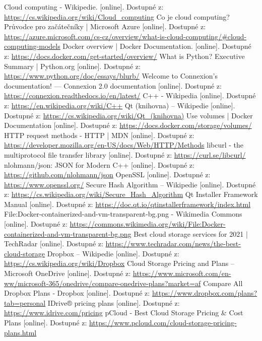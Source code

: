 \documentclass[
  glossaries,
]{kidiplom}
\begin{document}
\begin{thebibliography}{Cloud}
	 Cloud computing - Wikipedie. [online]. Dostupné z: 
		\url{https://cs.wikipedia.org/wiki/Cloud\_computing}
	 Co je cloud computing? Průvodce pro začátečníky | Microsoft Azure [online]. Dostupné z: 
		\url{https://azure.microsoft.com/cs-cz/overview/what-is-cloud-computing/\#cloud-computing-models}
	 Docker overview | Docker Documentation. [online]. Dostupné z:
		\url{https://docs.docker.com/get-started/overview/}
	 What is Python? Executive Summary | Python.org [online].
	Dostupné z:
		\url{https://www.python.org/doc/essays/blurb/}
	 Welcome to Connexion’s documentation! — Connexion 2.0 documentation [online]. Dostupné z: 
		\url{https://connexion.readthedocs.io/en/latest/}
	 C++ - Wikipedia [online]. Dostupné z:
		\url{https://en.wikipedia.org/wiki/C++}
	 Qt (knihovna) – Wikipedie [online]. Dostupné z:
		\url{https://cs.wikipedia.org/wiki/Qt\_(knihovna)}
	 Use volumes | Docker Documentation [online]. Dostupné z:
		\url{https://docs.docker.com/storage/volumes/}
	  HTTP request methods - HTTP | MDN [online]. Dostupné z:
		\url{https://developer.mozilla.org/en-US/docs/Web/HTTP/Methods}
	  libcurl - the multiprotocol file transfer library [online]. Dostupné z:
		\url{https://curl.se/libcurl/}
	  nlohmann/json: JSON for Modern C++ [online]. Dostupné z:
		\url{https://github.com/nlohmann/json}
	  OpenSSL [online]. Dostupné z:
		\url{https://www.openssl.org/}
	  Secure Hash Algorithm – Wikipedie [online]. Dostupné z:
		\url{https://cs.wikipedia.org/wiki/Secure\_Hash\_Algorithm}
	 Qt Installer Framework Manual [online]. Dostupné z:
		\url{https://doc.qt.io/qtinstallerframework/index.html}
	 File:Docker-containerized-and-vm-transparent-bg.png - Wikimedia Commons [online]. Dostupné z:
		\url{https://commons.wikimedia.org/wiki/File:Docker-containerized-and-vm-transparent-bg.png}
	 Best cloud storage services for 2021 | TechRadar [online]. Dostupné z:
		\url{https://www.techradar.com/news/the-best-cloud-storage}
	 Dropbox – Wikipedie [online]. Dostupné z:
		\url{https://cs.wikipedia.org/wiki/Dropbox}
	 Cloud Storage Pricing and Plans – Microsoft OneDrive [online]. Dostupné z:
		\url{https://www.microsoft.com/en-ww/microsoft-365/onedrive/compare-onedrive-plans?market=af}
	 Compare All Dropbox Plans ‐ Dropbox [online]. Dostupné z:
		\url{https://www.dropbox.com/plans?tab=personal}
	 IDrive® pricing plans [online]. Dostupné z:
		\url{https://www.idrive.com/pricing}
	 pCloud - Best Cloud Storage Pricing \& Cost Plans [online]. Dostupné z:
		\url{https://www.pcloud.com/cloud-storage-pricing-plans.html}
\end{thebibliography}
\clearpage
\end{document}
